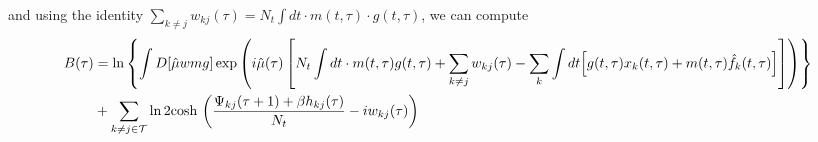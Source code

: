 \documentclass[%
 reprint,
superscriptaddress,
 amsmath,amssymb,
 prl,
]{revtex4-2}
\begin{document}
and using the identity $
     \sum_{k\neq j} w_{kj}(\tau) = N_t\int dt \cdot m(t,\tau) \cdot g(t,\tau)$,
we can compute
\begin{align}
\nonumber   B(\tau) &= \ln\left\{ \int D[\hat{\mu}w m g] \exp\left( i\hat{\mu}(\tau) \left[N_t\int dt\cdot m(t,\tau)g(t,\tau) + \sum_{k\neq j} w_{kj}(\tau) - \sum_k \int dt \Big[g(t,\tau)x_k(t,\tau) + m(t,\tau)\hat{f}_k(t,\tau)\Big]  \right]      \right) \right\} \\
  &+ \sum_{k\neq j \in \mathcal{T}} \ln 2{\rm cosh}\,\left(\frac{\Psi_{kj}(\tau+1) +\beta h_{kj}(\tau)}{N_t} - i w_{kj}(\tau) \right) 
\end{align} 
\end{document}
